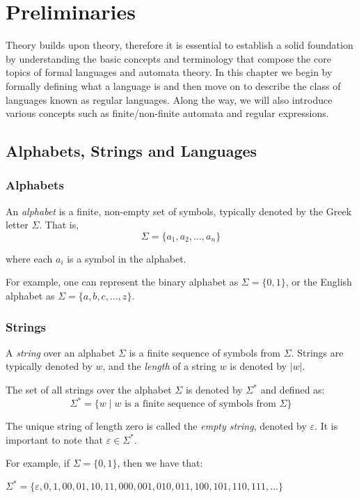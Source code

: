 \chapter{Preliminaries}\label{chap:prelim}
Theory builds upon theory, therefore it is essential to establish a solid foundation by understanding the basic concepts and terminology that compose the core topics of formal languages and automata theory.
In this chapter we begin by formally defining what a language is and then move on to describe the class of languages known as regular languages.
Along the way, we will also introduce various concepts such as finite/non-finite automata and regular expressions.

\section{Alphabets, Strings and Languages}
\subsection*{Alphabets}

An \emph{alphabet} is a finite, non-empty set of symbols, typically denoted by the Greek letter $\Sigma$. That is,
\[
\Sigma = \{ a_1, a_2, \dots, a_n \}
\]

\noindent where each $a_i$ is a symbol in the alphabet.

For example, one can represent the binary alphabet as $\Sigma = \{ 0, 1 \}$, or the English alphabet as $\Sigma = \{ a, b, c, \ldots, z \}$.

\subsection*{Strings}
A \emph{string} over an alphabet $\Sigma$ is a finite sequence of symbols from $\Sigma$. Strings are typically denoted by $w$, and the \emph{length} of a string $w$ is denoted by $|w|$.

The set of all strings over the alphabet $\Sigma$ is denoted by $\Sigma^*$ and defined as:
\[
\Sigma^* = \{ w \mid w \text{ is a finite sequence of symbols from } \Sigma \}
\]

The unique string of length zero is called the \emph{empty string}, denoted by $\varepsilon$.
It is important to note that $\varepsilon \in \Sigma^*$.

For example, if $\Sigma = \{ 0, 1 \}$, then we have that:
\begin{center}
	$\Sigma^* = \{ \varepsilon, 0, 1, 00, 01, 10, 11, 000, 001, 010, 011, 100, 101, 110, 111, \ldots \}$
\end{center}

